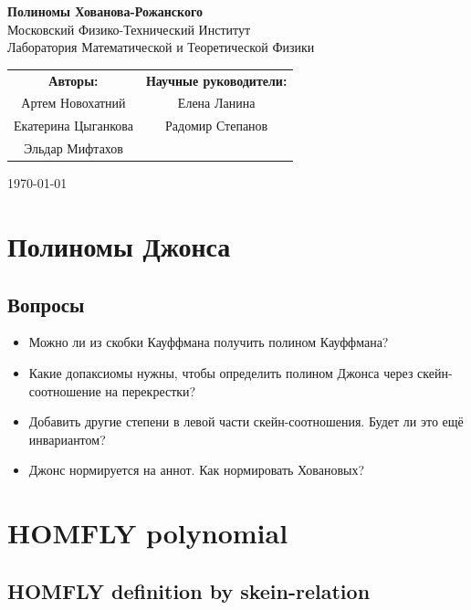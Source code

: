 \documentclass[12pt,a4paper]{article}
\begin{document}
\begin{center}
    \Large \textbf{Полиномы Хованова-Рожанского} \\[1em]
    \small
    Московский Физико-Технический Институт \\[0.5em]
    Лаборатория Математической и Теоретической Физики
\end{center}

\small
\begin{flushright}
\begin{tabular}{c c}
\textbf{Авторы:} & \textbf{Научные руководители:} \\[0.5em]
Артем Новохатний & Елена Ланина \\
Екатерина Цыганкова & Радомир Степанов \\
Эльдар Мифтахов & \\
\end{tabular}

\vspace{1em}

\today
\end{flushright}
\normalsize
\vspace{2em}


\tableofcontents
\vspace{2em}

\section{Полиномы Джонса}

\subsection{Вопросы}
\begin{itemize}
    \item  Можно ли из скобки Кауффмана получить полином Кауффмана?
    \item  Какие допаксиомы нужны, чтобы определить полином Джонса через скейн-соотношение на перекрестки?
    \item  Добавить другие степени в левой части скейн-соотношения. Будет ли это ещё инвариантом?
    \item Джонс нормируется на аннот. Как нормировать Ховановых?
\end{itemize}

\section{HOMFLY polynomial}
\subsection{HOMFLY definition by skein-relation}
\end{document}
